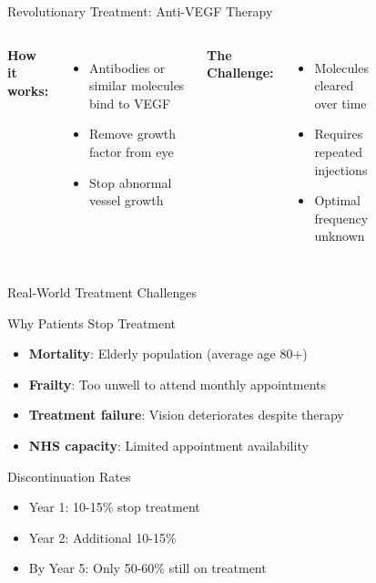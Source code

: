 \documentclass[10pt,aspectratio=169]{beamer}
\begin{document}
\begin{frame}{Revolutionary Treatment: Anti-VEGF Therapy}
\begin{columns}[T]
\textbf{How it works:}
\begin{itemize}
    \item Antibodies or similar molecules bind to VEGF
    \item Remove growth factor from eye
    \item Stop abnormal vessel growth
\end{itemize}

\vspace{0.5cm}
\alert{\textbf{The Challenge:}}
\begin{itemize}
    \item Molecules cleared over time
    \item Requires repeated injections
    \item Optimal frequency unknown
\end{itemize}

\begin{figure}
    \centering
\end{figure}
\end{columns}
\end{frame}

\begin{frame}{Real-World Treatment Challenges}
\begin{alertblock}{Why Patients Stop Treatment}
\begin{itemize}
    \item \textbf{Mortality}: Elderly population (average age 80+)
    \item \textbf{Frailty}: Too unwell to attend monthly appointments
    \item \textbf{Treatment failure}: Vision deteriorates despite therapy
    \item \textbf{NHS capacity}: Limited appointment availability
\end{itemize}
\end{alertblock}

\begin{block}{Discontinuation Rates}
\begin{itemize}
    \item Year 1: 10-15\% stop treatment
    \item Year 2: Additional 10-15\%
    \item By Year 5: Only 50-60\% still on treatment
\end{itemize}
\end{block}

\end{frame}
\end{document}
